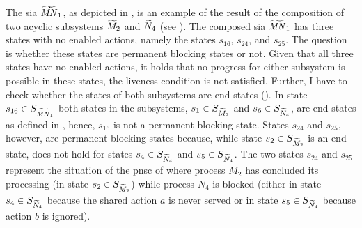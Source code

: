 The \gls{sia} $\widetilde{\mathit{MN}}_1$, as depicted in \Fig{\ref{fig_sia_ex_fold}}, is an example of the result of the composition of two acyclic subsystems $\widetilde{M}_2$ and $\widetilde{N}_4$ (see \Fig{\ref{fig_sia_ex}}).
The composed \gls{sia} $\widetilde{\mathit{MN}}_1$ has three states with no enabled actions, namely the states $s_{16}$, $s_{24}$, and $s_{25}$.
The question is whether these states are permanent blocking states or not.
Given that all three states have no enabled actions, it holds that no progress for either subsystem is possible in these states, \ie the liveness condition  is not satisfied.
Further, I have to check whether the states of both subsystems are end states ().
In state $s_{16} \in S_{\widetilde{\mathit{MN}}_1}$ both states in the subsystems, $s_1 \in S_{\widetilde{M}_2}$ and $s_6 \in S_{\widetilde{N}_4}$, are end states as defined in \Equ{\ref{eq_sia_end}}, hence, $s_{16}$ is not a permanent blocking state.
States $s_{24}$ and $s_{25}$, however, are permanent blocking states because, while state $s_2 \in S_{\widetilde{M}_2}$ is an end state, \Equ{\ref{eq_sia_end}} does not hold for states $s_4 \in S_{\widetilde{N}_4}$ and $s_5 \in S_{\widetilde{N}_4}$.
The two states $s_{24}$ and $s_{25}$ represent the situation of the \gls{pnsc} of \Fig{\ref{fig_sia_ex}} where process $M_2$ has concluded its processing (in state $s_2 \in S_{\widetilde{M}_2}$) while process $N_4$ is blocked (either in state $s_4 \in S_{\widetilde{N}_4}$ because the shared action $a$ is never served or in state $s_5 \in S_{\widetilde{N}_4}$ because action $b$ is ignored).




